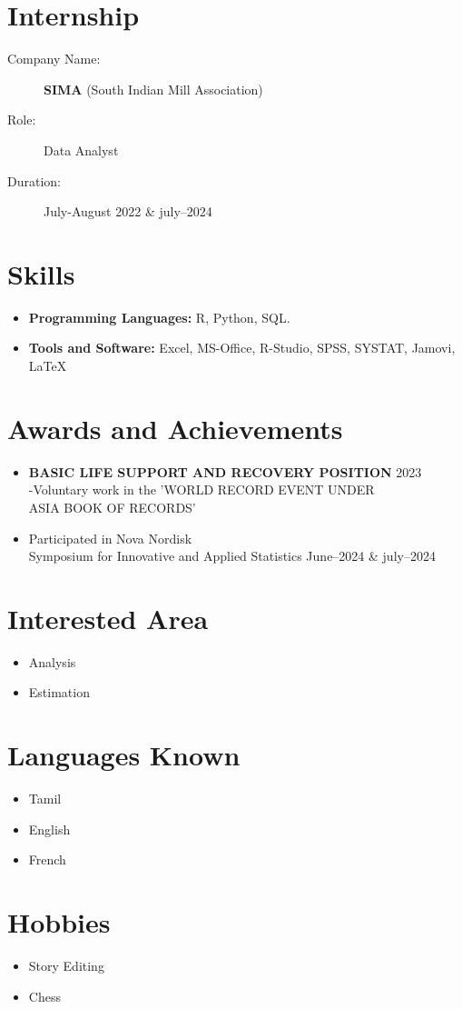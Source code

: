 \documentclass[a4paper,11pt]{article}
\begin{document}
	\section*{Internship}
	\begin{description}
		\item[Company Name:] \textbf{SIMA} (South Indian Mill Association)
		\item[Role:] Data Analyst
		\item[Duration:] July-August 2022 \& july--2024
	\end{description}
	\section*{Skills}
	\begin{itemize}
		\item \textbf{Programming Languages:}  R, Python, SQL.
		\item \textbf{Tools and Software:} Excel, MS-Office,
		R-Studio, SPSS, SYSTAT, Jamovi, \LaTeX
		
	\end{itemize}

	
	\section*{Awards and Achievements}
	\noindent
	\begin{itemize}
	\item 
	\textbf{BASIC LIFE SUPPORT AND RECOVERY POSITION} \hfill 2023 \\
	-Voluntary work in the 'WORLD RECORD EVENT UNDER \\ ASIA BOOK OF RECORDS'
	\item  Participated in Nova Nordisk \\ Symposium for Innovative and Applied Statistics \hfill June--2024 \& july--2024
   \end{itemize} 
	\section*{Interested Area}
	\begin{itemize}
		\item Analysis 
		\item Estimation 
		\end{itemize}
	\section*{Languages Known}
	\begin{itemize}
		\item Tamil 
		\item English 
		\item French
		
		\end{itemize}
	\section*{Hobbies}
	\begin{itemize}
		\item Story Editing
		\item Chess
		 \end{itemize}
\end{document}
